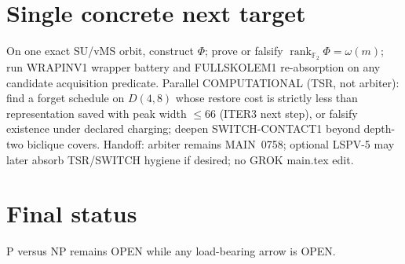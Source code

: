 \documentclass[11pt]{article}
\begin{document}
\section*{Single concrete next target}
On one exact SU/vMS orbit, construct $\Phi$; prove or falsify
$\boxed{\operatorname{rank}_{\mathbb F_2}\Phi=\omega(m)}$;
run WRAPINV1 wrapper battery and FULLSKOLEM1 re-absorption on any candidate acquisition predicate.
Parallel COMPUTATIONAL (TSR, not arbiter): find a forget schedule on $D(4,8)$ whose restore cost is strictly less than representation saved with peak width $\le 66$ (ITER3 next step), or falsify existence under declared charging; deepen SWITCH-CONTACT1 beyond depth-two biclique covers.
Handoff: arbiter remains MAIN~0758; optional LSPV-5 may later absorb TSR/SWITCH hygiene if desired; no GROK main.tex edit.

\section*{Final status}
P versus NP remains OPEN while any load-bearing arrow is OPEN.

\end{document}
